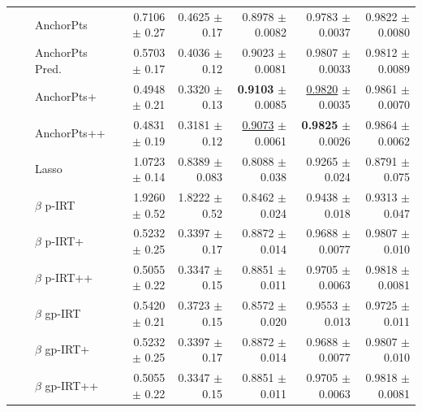 \begin{longtable}{llp{}rrrrr}
 &  & AnchorPts & 0.7106 {\scriptsize $\pm$ 0.27} & 0.4625 {\scriptsize $\pm$ 0.17} & 0.8978 {\scriptsize $\pm$ 0.0082} & 0.9783 {\scriptsize $\pm$ 0.0037} & 0.9822 {\scriptsize $\pm$ 0.0080} \\
 &  & AnchorPts Pred. & 0.5703 {\scriptsize $\pm$ 0.17} & 0.4036 {\scriptsize $\pm$ 0.12} & 0.9023 {\scriptsize $\pm$ 0.0081} & 0.9807 {\scriptsize $\pm$ 0.0033} & 0.9812 {\scriptsize $\pm$ 0.0089} \\
 &  & AnchorPts+ & 0.4948 {\scriptsize $\pm$ 0.21} & 0.3320 {\scriptsize $\pm$ 0.13} & \textbf{0.9103} {\scriptsize $\pm$ 0.0085} & \underline{0.9820} {\scriptsize $\pm$ 0.0035} & 0.9861 {\scriptsize $\pm$ 0.0070} \\
 &  & AnchorPts++ & 0.4831 {\scriptsize $\pm$ 0.19} & 0.3181 {\scriptsize $\pm$ 0.12} & \underline{0.9073} {\scriptsize $\pm$ 0.0061} & \textbf{0.9825} {\scriptsize $\pm$ 0.0026} & 0.9864 {\scriptsize $\pm$ 0.0062} \\
 &  & Lasso & 1.0723 {\scriptsize $\pm$ 0.14} & 0.8389 {\scriptsize $\pm$ 0.083} & 0.8088 {\scriptsize $\pm$ 0.038} & 0.9265 {\scriptsize $\pm$ 0.024} & 0.8791 {\scriptsize $\pm$ 0.075} \\
 &  & $\beta$ p-IRT & 1.9260 {\scriptsize $\pm$ 0.52} & 1.8222 {\scriptsize $\pm$ 0.52} & 0.8462 {\scriptsize $\pm$ 0.024} & 0.9438 {\scriptsize $\pm$ 0.018} & 0.9313 {\scriptsize $\pm$ 0.047} \\
 &  & $\beta$ p-IRT+ & 0.5232 {\scriptsize $\pm$ 0.25} & 0.3397 {\scriptsize $\pm$ 0.17} & 0.8872 {\scriptsize $\pm$ 0.014} & 0.9688 {\scriptsize $\pm$ 0.0077} & 0.9807 {\scriptsize $\pm$ 0.010} \\
 &  & $\beta$ p-IRT++ & 0.5055 {\scriptsize $\pm$ 0.22} & 0.3347 {\scriptsize $\pm$ 0.15} & 0.8851 {\scriptsize $\pm$ 0.011} & 0.9705 {\scriptsize $\pm$ 0.0063} & 0.9818 {\scriptsize $\pm$ 0.0081} \\
 &  & $\beta$ gp-IRT & 0.5420 {\scriptsize $\pm$ 0.21} & 0.3723 {\scriptsize $\pm$ 0.15} & 0.8572 {\scriptsize $\pm$ 0.020} & 0.9553 {\scriptsize $\pm$ 0.013} & 0.9725 {\scriptsize $\pm$ 0.011} \\
 &  & $\beta$ gp-IRT+ & 0.5232 {\scriptsize $\pm$ 0.25} & 0.3397 {\scriptsize $\pm$ 0.17} & 0.8872 {\scriptsize $\pm$ 0.014} & 0.9688 {\scriptsize $\pm$ 0.0077} & 0.9807 {\scriptsize $\pm$ 0.010} \\
 &  & $\beta$ gp-IRT++ & 0.5055 {\scriptsize $\pm$ 0.22} & 0.3347 {\scriptsize $\pm$ 0.15} & 0.8851 {\scriptsize $\pm$ 0.011} & 0.9705 {\scriptsize $\pm$ 0.0063} & 0.9818 {\scriptsize $\pm$ 0.0081} \\

\end{longtable}
